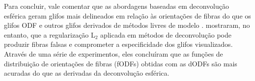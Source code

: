 
Para concluir, vale comentar que as abordagens baseadas em deconvolução esférica \cite{Tournier2004DirectEO, tournier2007} geram glifos mais delineados em relação às orientações de fibras do que os glifos ODF e outros glifos derivados de métodos livres de modelo \cite{dellacqua2019}.  mostraram, no entanto, que a regularização L$_2$ aplicada em métodos de deconvolução pode produzir fibras falsas e comprometer a especificidade dos glifos visualizados. Através de uma série de experimentos, eles concluíram que as funções de distribuição de orientações de fibras (fODFs) obtidas com as dODFs são mais acuradas do que as derivadas da deconvolução esférica.





